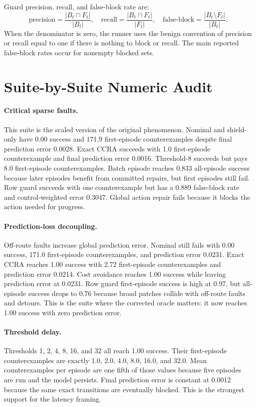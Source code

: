 \documentclass{article}
\begin{document}
Guard precision, recall, and false-block rate are:
\[
    \text{precision}=\frac{|B_t\cap F_t|}{|B_t|},\quad
    \text{recall}=\frac{|B_t\cap F_t|}{|F_t|},\quad
    \text{false-block}=\frac{|B_t\setminus F_t|}{|B_t|}.
\]
When the denominator is zero, the runner uses the benign convention of precision or recall equal to one if there is nothing to block or recall. The main reported false-block rates occur for nonempty blocked sets.

\section{Suite-by-Suite Numeric Audit}

\paragraph{Critical sparse faults.}
This suite is the scaled version of the original phenomenon. Nominal and shield-only have 0.00 success and 171.9 first-episode counterexamples despite final prediction error 0.0028. Exact CCRA succeeds with 1.0 first-episode counterexample and final prediction error 0.0016. Threshold-8 succeeds but pays 8.0 first-episode counterexamples. Batch episode reaches 0.833 all-episode success because later episodes benefit from committed repairs, but first episodes still fail. Row guard succeeds with one counterexample but has a 0.889 false-block rate and control-weighted error 0.3047. Global action repair fails because it blocks the action needed for progress.

\paragraph{Prediction-loss decoupling.}
Off-route faults increase global prediction error. Nominal still fails with 0.00 success, 171.0 first-episode counterexamples, and prediction error 0.0231. Exact CCRA reaches 1.00 success with 2.72 first-episode counterexamples and prediction error 0.0214. Cost avoidance reaches 1.00 success while leaving prediction error at 0.0231. Row guard first-episode success is high at 0.97, but all-episode success drops to 0.76 because broad patches collide with off-route faults and detours. This is the suite where the corrected oracle matters: it now reaches 1.00 success with zero prediction error.

\paragraph{Threshold delay.}
Thresholds 1, 2, 4, 8, 16, and 32 all reach 1.00 success. Their first-episode counterexamples are exactly 1.0, 2.0, 4.0, 8.0, 16.0, and 32.0. Mean counterexamples per episode are one fifth of those values because five episodes are run and the model persists. Final prediction error is constant at 0.0012 because the same exact transitions are eventually blocked. This is the strongest support for the latency framing.
\end{document}
